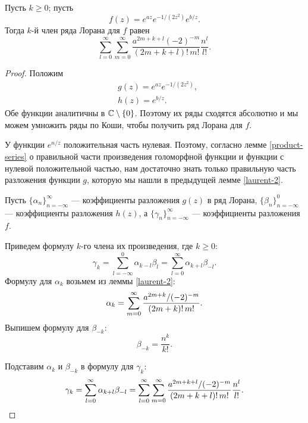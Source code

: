 \documentclass[../paper.tex]{subfiles}
\begin{document}
\begin{Lem}
\label{laurent-3}
Пусть $k \ge 0$; пусть
\[
	f(z) = e^{az} e^{-1/(2z^2)} e^{b/z}
.\]
Тогда $k$-й член ряда Лорана для $f$ равен
\[
	\sum_{l=0}^{\infty}
	\sum_{m=0}^{\infty} \frac{a^{2m+k+l} (-2)^{-m}}{(2m+k+l)!\,m!}
	\frac{n^l}{l!}
.\]
\end{Lem}
\begin{proof}
Положим
\begin{align*}
	& g(z) = e^{az} e^{-1/(2z^2)}, \\
	& h(z) = e^{b/z}
.\end{align*}
Обе функции аналитичны в $\mathbb{C} \setminus \{0\}$.
Поэтому их ряды сходятся абсолютно и мы можем умножить ряды по Коши, чтобы получить ряд Лорана для $f$.

У функции $e^{n/z}$ положительная часть нулевая.
Поэтому, согласно лемме \ref{product-series} о правильной части произведения голоморфной функции и функции с нулевой положительной частью, 
нам достаточно знать только правильную часть разложения функции $g$, которую мы нашли в предыдущей лемме \ref{laurent-2}.

Пусть $\{\alpha_n\}_{n=-\infty}^\infty$ --- коэффициенты разложения $g(z)$ в ряд Лорана, $\{\beta_n\}_{n=-\infty}^0$ --- коэффициенты разложения $h(z)$,
а $\{\gamma_n\}_{n=-\infty}^\infty$ --- коэффициенты разложения $f$.

Приведем формулу $k$-го члена их произведения, где $k \ge 0$:
\[
    \gamma_k =
    \sum_{l=-\infty}^{0} \alpha_{k-l} \beta_l =
    \sum_{l=0}^{\infty} \alpha_{k+l} \beta_{-l}
.\]
Формулу для $\alpha_k$ возьмем из леммы \ref{laurent-2}:
\[
	\alpha_k = \sum_{m=0}^{\infty} \frac{a^{2m+k} / (-2)^{-m}}{(2m+k)!\,m!} \\
.\]
Выпишем формулу для $\beta_{-k}$:
\[
	\beta_{-k} = \frac{n^k}{k!}
.\]

Подставим $\alpha_k$ и $\beta_{-k}$ в формулу для $\gamma_k$:
\[
    \gamma_k =
    \sum_{l=0}^{\infty} \alpha_{k+l} \beta_{-l} =
%
    \sum_{l=0}^{\infty}
    \sum_{m=0}^{\infty} \frac{a^{2m+k+l} / (-2)^{-m}}{(2m+k+l)!\,m!} \\
    \frac{n^l}{l!}
.\]
\end{proof}
\end{document}
